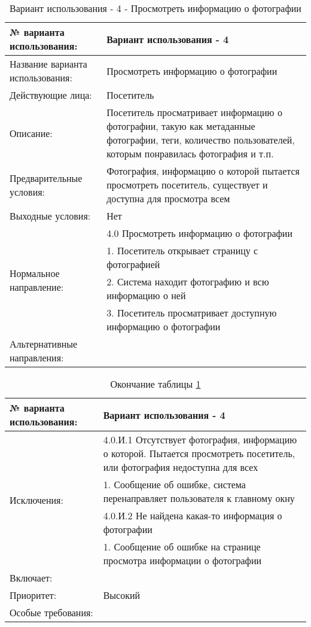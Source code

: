 \begin{table}[H]
  \caption{\onehalfspacing Вариант использования - 4 - Просмотреть информацию о фотографии}\label{use-case-4-table}
  \begin{tabular}{|p{6cm}|p{10cm}|}
  \hline № варианта использования: & Вариант использования - 4 \\
  \hline Название варианта использования: & Просмотреть информацию о фотографии \\
  \hline Действующие лица: & Посетитель \\
  \hline Описание: & Посетитель просматривает информацию о фотографии, такую как метаданные фотографии, теги, количество пользователей, которым понравилась фотография и т.п.  \\
  \hline Предварительные условия: & Фотография, информацию о которой пытается просмотреть посетитель, существует и доступна для просмотра всем \\
  \hline Выходные условия: & Нет \\
  \hline \multirow{4}{*}{Нормальное направление:} & 4.0 Просмотреть информацию о фотографии \\
  \cline{2-2} & 1. Посетитель открывает страницу с фотографией \\
  \cline{2-2} & 2. Система находит фотографию и всю информацию о ней \\
  \cline{2-2} & 3. Посетитель просматривает доступную информацию о фотографии \\
  \hline Альтернативные направления: &  \\
  \end{tabular}
\end{table}
\begin{table}[H]
  \caption*{Окончание таблицы \ref{use-case-4-table}}
  \begin{tabular}{|p{6cm}|p{10cm}|}
  \hline № варианта использования: & Вариант использования - 4 \\
  \hline \multirow{4}{*}{Исключения:} & 4.0.И.1 Отсутствует фотография, информацию о которой. Пытается просмотреть посетитель, или фотография недоступна для всех \\
  \cline{2-2} & 1. Сообщение об ошибке, система перенаправляет пользователя к главному окну \\
  \cline{2-2} & 4.0.И.2 Не найдена какая-то информация о фотографии \\
  \cline{2-2} & 1. Сообщение об ошибке на странице просмотра информации о фотографии \\
  \hline Включает: &  \\
  \hline Приоритет: & Высокий \\
  \hline Особые требования: & \\
  \hline
  \end{tabular}
\end{table}

